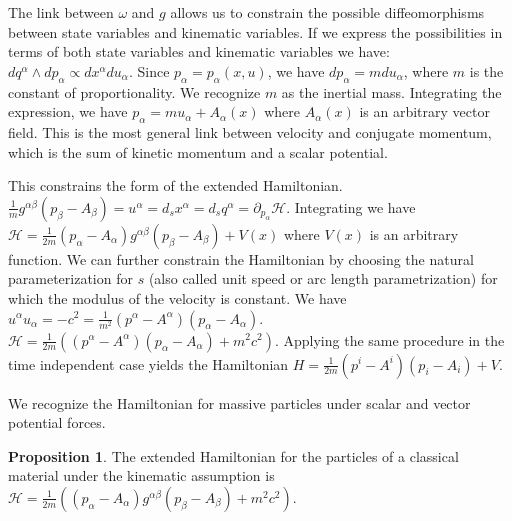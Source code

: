 \documentclass[aps,pra,10pt,twocolumn,floatfix,nofootinbib]{revtex4-1}
\numberwithin{equation}{section}
\theoremstyle{definition}
\newtheorem{prop}[equation]{Proposition}
\begin{document}
The link between $\omega$ and $g$ allows us to constrain the possible diffeomorphisms between state variables and kinematic variables. If we express the possibilities in terms of both state variables and kinematic variables we have: $dq^\alpha \wedge dp_\alpha \propto dx^\alpha du_\alpha$. Since  $p_\alpha=p_\alpha(x, u)$, we have $dp_\alpha = m du_\alpha$, where $m$ is the constant of proportionality. We recognize $m$ as the inertial mass. Integrating the expression, we have $p_\alpha = m u_\alpha + A_\alpha(x)$ where $A_\alpha(x)$ is an arbitrary vector field. This is the most general link between velocity and conjugate momentum, which is the sum of kinetic momentum and a scalar potential.

This constrains the form of the extended Hamiltonian. $\frac{1}{m}g^{\alpha\beta}(p_\beta-A_\beta) = u^\alpha = d_s x^\alpha = d_s q^\alpha = \partial_{p_\alpha} \mathcal{H}$. Integrating we have $\mathcal{H}=\frac{1}{2m}(p_\alpha-A_\alpha)g^{\alpha\beta}(p_\beta-A_\beta)+V(x)$ where $V(x)$ is an arbitrary function. We can further constrain the Hamiltonian by choosing the natural parameterization for $s$ (also called unit speed or arc length parametrization) for which the modulus of the velocity is constant. We have $u^\alpha u_\alpha = - c^2 = \frac{1}{m^2}(p^\alpha-A^\alpha)(p_\alpha-A_\alpha)$. $\mathcal{H}=\frac{1}{2m}((p^\alpha-A^\alpha)(p_\alpha-A_\alpha) + m^2 c^2)$. Applying the same procedure in the time independent case yields the Hamiltonian $H=\frac{1}{2m}(p^i-A^i)(p_i-A_i)+V$.

We recognize the Hamiltonian for massive particles under scalar and vector potential forces.

\begin{prop}\label{prop:kinetic_hamiltonian}
The extended Hamiltonian for the particles of a classical material under the kinematic assumption is $\mathcal{H}=\frac{1}{2m}((p_\alpha-A_\alpha)g^{\alpha\beta}(p_\beta-A_\beta) + m^2 c^2)$.
\end{prop}
\end{document}
